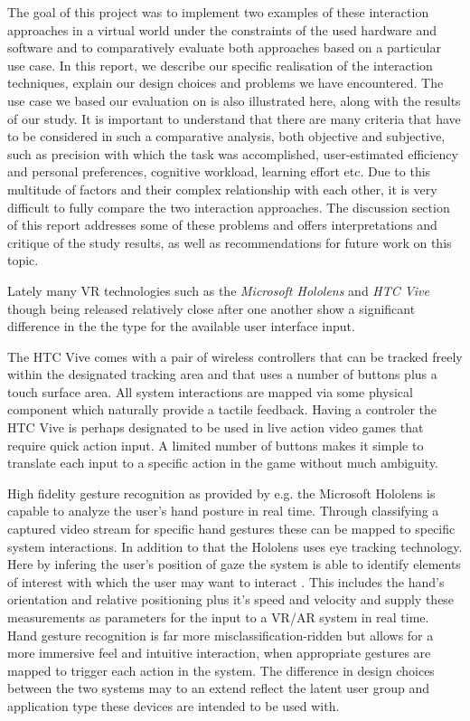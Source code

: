 The goal of this project was to implement two examples of these interaction approaches in a virtual world under the constraints of the used hardware and software and to comparatively evaluate both approaches based on a particular use case. In this report, we describe our specific realisation of the interaction techniques, explain our design choices and problems we have encountered. The use case we based our evaluation on is also illustrated here, along with the results of our study. It is important to understand that there are many criteria that have to be considered in such a comparative analysis, both objective and subjective, such as precision with which the task was accomplished, user-estimated efficiency and personal preferences, cognitive workload, learning effort etc. Due to this multitude of factors and their complex relationship with each other, it is very difficult to fully compare the two interaction approaches. The discussion section of this report addresses some of these problems and offers interpretations and critique of the study results, as well as recommendations for future work on this topic.








\iffalse
Lately many VR technologies such as the \textit{Microsoft Hololens} and \textit{HTC Vive} though being released relatively close after one another show a significant difference in the the type for the available user interface input.

The HTC Vive comes with a pair of wireless controllers that can be tracked freely within the designated tracking area and that uses a number of buttons plus a touch surface area.
All system interactions are mapped via some physical component which naturally provide a tactile feedback.
Having a controler the HTC Vive is perhaps designated to be used in live action video games that require quick action input.
A limited number of buttons makes it simple to translate each input to a specific action in the game without much ambiguity.

High fidelity gesture recognition as provided by e.g. the Microsoft Hololens is capable to analyze the user's hand posture in real time.
Through classifying a captured video stream for specific hand gestures these can be mapped to specific system interactions.
In addition to that the Hololens uses eye tracking technology.
Here by infering the user's position of gaze the system is able to identify elements of interest with which the user may want to interact .
This includes the hand's orientation and relative positioning plus it's speed and velocity and supply these measurements as parameters for the input to a VR/AR system in real time.
Hand gesture recognition is far more misclassification-ridden but allows for a more immersive feel and intuitive interaction, when appropriate gestures are mapped to trigger each action in the system.
The difference in design choices between the two systems may to an extend reflect the latent user group and application type these devices are intended to be used with.

